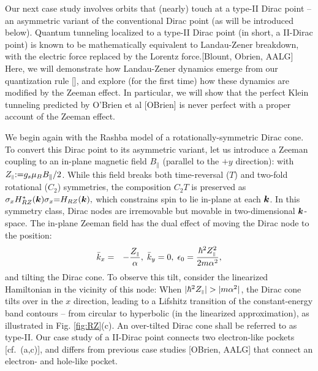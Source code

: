 \documentclass[aps, prb, showpacs, twocolumn, notitlepage, superscriptaddress]{revtex4-1}
\begin{document}
Our next case study involves orbits that (nearly) touch at a type-II Dirac point -- an asymmetric variant of the conventional Dirac point (as will be introduced below). Quantum tunneling localized to a type-II Dirac point  (in short, a II-Dirac point) is known to be mathematically equivalent to  Landau-Zener breakdown, with the electric force replaced by the Lorentz force.[Blount, Obrien, AALG] Here, we will demonstrate how  Landau-Zener dynamics emerge from our quantization rule [], and explore (for the first time) how these dynamics are modified by the Zeeman effect. In particular, we will show that the perfect Klein tunneling predicted by O'Brien et al [OBrien] is never perfect with a proper account of the Zeeman effect. 



We begin again with the Rashba model of a rotationally-symmetric Dirac cone. To convert this Dirac point to its asymmetric variant, 
let us introduce a Zeeman coupling to an in-plane magnetic field $B_\parallel$ (parallel to the $+y$ direction):
with $Z_{\scriptscriptstyle{\parallel}}{:}{=}{g_s}\mu_B B_{\parallel}/2$.
While this field breaks both time-reversal ($T$) and two-fold rotational ($C_2$) symmetries, the composition $C_2T$ is preserved as $\sigma_x H^*_{RZ}(\boldsymbol{k})\sigma_x{=}H_{RZ}(\boldsymbol{k}),$ which constrains spin to lie in-plane at each $\boldsymbol{k}$. In this symmetry class, Dirac nodes are irremovable but movable   in two-dimensional $\boldsymbol{k}$-space. The in-plane Zeeman field has the dual effect of  moving the Dirac node  to the position:
\begin{eqnarray}
\bar{k}_x & = & -\frac{Z_{\scriptscriptstyle{\parallel}}}{\alpha},\;\bar{k}_y=0,\;\epsilon_{0}=\frac{{\hbar^2}Z_{\scriptscriptstyle{\parallel}}^{2}}{2m\alpha^2},\label{whereisdiracpoint}
\end{eqnarray}
and tilting the Dirac cone. To observe this tilt, consider the linearized Hamiltonian in the vicinity of this node: 
When $|\hbar^2\zpar|>|m\alpha^2|$, the Dirac cone tilts over in the $x$ direction, leading to a Lifshitz transition  of the constant-energy band contours -- from circular to hyperbolic (in the linearized approximation), as illustrated in Fig. \ref{fig:RZ}(c). An over-tilted Dirac cone shall be referred to as type-II. Our case study of a II-Dirac point  connects  two electron-like  pockets [cf.\ (a,c)], and  differs from previous case studies [OBrien, AALG] that connect an electron- and hole-like pocket.
\end{document}
